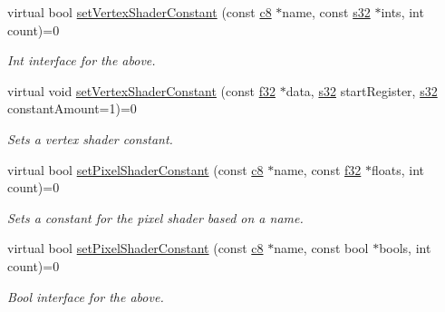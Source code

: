 \begin{DoxyCompactItemize}
\mbox{\label{classirr_1_1video_1_1IMaterialRendererServices_a4dc7be8f9a786b9805c46f535ff7d896}} 
virtual bool \hyperlink{classirr_1_1video_1_1IMaterialRendererServices_a4dc7be8f9a786b9805c46f535ff7d896}{set\+Vertex\+Shader\+Constant} (const \hyperlink{namespaceirr_a9395eaea339bcb546b319e9c96bf7410}{c8} $\ast$name, const \hyperlink{namespaceirr_ac66849b7a6ed16e30ebede579f9b47c6}{s32} $\ast$ints, int count)=0
\begin{DoxyCompactList}\small\item\em Int interface for the above. \end{DoxyCompactList}\item 
virtual void \hyperlink{classirr_1_1video_1_1IMaterialRendererServices_a1f11a6df7625205511e91fb036e03929}{set\+Vertex\+Shader\+Constant} (const \hyperlink{namespaceirr_a0277be98d67dc26ff93b1a6a1d086b07}{f32} $\ast$data, \hyperlink{namespaceirr_ac66849b7a6ed16e30ebede579f9b47c6}{s32} start\+Register, \hyperlink{namespaceirr_ac66849b7a6ed16e30ebede579f9b47c6}{s32} constant\+Amount=1)=0
\begin{DoxyCompactList}\small\item\em Sets a vertex shader constant. \end{DoxyCompactList}\item 
virtual bool \hyperlink{classirr_1_1video_1_1IMaterialRendererServices_a6f612293300f643148bd537a8a70ff32}{set\+Pixel\+Shader\+Constant} (const \hyperlink{namespaceirr_a9395eaea339bcb546b319e9c96bf7410}{c8} $\ast$name, const \hyperlink{namespaceirr_a0277be98d67dc26ff93b1a6a1d086b07}{f32} $\ast$floats, int count)=0
\begin{DoxyCompactList}\small\item\em Sets a constant for the pixel shader based on a name. \end{DoxyCompactList}\item 
\mbox{\label{classirr_1_1video_1_1IMaterialRendererServices_a252ccc1a6055f784c252435e1427de1b}} 
virtual bool \hyperlink{classirr_1_1video_1_1IMaterialRendererServices_a252ccc1a6055f784c252435e1427de1b}{set\+Pixel\+Shader\+Constant} (const \hyperlink{namespaceirr_a9395eaea339bcb546b319e9c96bf7410}{c8} $\ast$name, const bool $\ast$bools, int count)=0
\begin{DoxyCompactList}\small\item\em Bool interface for the above. \end{DoxyCompactList}\item 

\end{DoxyCompactItemize}
